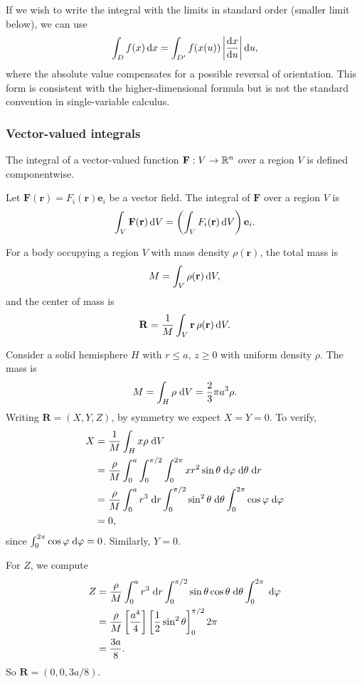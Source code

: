 \documentclass[a4paper]{article}
\begin{document}
\begin{rmk}
  If we wish to write the integral with the limits in standard order (smaller limit below), we can use
  \[
    \int_D f(x) \, \mathrm{d} x = \int_{D'} f(x(u)) \left| \frac{\mathrm{d} x}{\mathrm{d} u} \right| \mathrm{d} u,
  \]
  where the absolute value compensates for a possible reversal of orientation. This form is consistent with the higher-dimensional formula but is not the standard convention in single-variable calculus.
\end{rmk}

\subsubsection*{Vector-valued integrals}
The integral of a vector-valued function $\mathbf{F}: V \to \mathbb{R}^n$ over a region $V$ is defined componentwise.

\begin{defi}
  Let $\mathbf{F}(\mathbf{r}) = F_i(\mathbf{r}) \mathbf{e}_i$ be a vector field. The integral of $\mathbf{F}$ over a region $V$ is
  \[
    \int_V \mathbf{F}(\mathbf{r}) \, \mathrm{d} V = \left( \int_V F_i(\mathbf{r}) \, \mathrm{d} V \right) \mathbf{e}_i.
  \]
\end{defi}

\begin{eg}
  For a body occupying a region $V$ with mass density $\rho(\mathbf{r})$, the total mass is
  \[
    M = \int_V \rho(\mathbf{r}) \, \mathrm{d} V,
  \]
  and the center of mass is
  \[
    \mathbf{R} = \frac{1}{M} \int_V \mathbf{r} \, \rho(\mathbf{r}) \, \mathrm{d} V.
  \]
\end{eg}

\begin{eg}
  Consider a solid hemisphere $H$ with $r \leq a$, $z \geq 0$ with uniform density $\rho$. The mass is
  \[
    M = \int_H \rho \;\mathrm{d} V = \frac{2}{3}\pi a^3\rho.
  \]
  Writing $\mathbf{R} = (X, Y, Z)$, by symmetry we expect $X = Y = 0$. To verify,
  \begin{align*}
    X &= \frac{1}{M}\int_H x\rho \;\mathrm{d} V\\
    &= \frac{\rho}{M}\int_0^a \int_0^{\pi/2}\int_0^{2\pi}xr^2 \sin \theta\;\mathrm{d} \varphi\;\mathrm{d} \theta\;\mathrm{d} r\\
    &= \frac{\rho}{M}\int_0^{a}r^3\;\mathrm{d} r \int_0^{\pi/2}\sin^2\theta\;\mathrm{d} \theta \int_0^{2\pi}\cos\varphi\;\mathrm{d} \varphi\\
    &= 0,
  \end{align*}
  since $\int_0^{2\pi}\cos\varphi\;\mathrm{d}\varphi = 0$. Similarly, $Y = 0$.

  For $Z$, we compute
  \begin{align*}
    Z &= \frac{\rho}{M}\int_0^a r^3\;\mathrm{d} r \int_0^{\pi/2}\sin\theta\cos\theta\;\mathrm{d} \theta \int_0^{2\pi}\;\mathrm{d} \varphi\\
    &= \frac{\rho}{M}\left[\frac{a^4}{4}\right]\left[\frac{1}{2}\sin^2\theta\right]_0^{\pi/2}2\pi\\
    &= \frac{3a}{8}.
  \end{align*}
  So $\mathbf{R} = (0, 0, 3a/8)$.
\end{eg}
\end{document}
